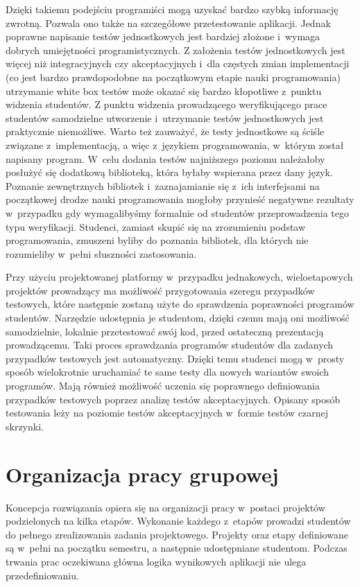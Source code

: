 Dzięki takiemu podejściu programiści mogą uzyskać bardzo szybką informację zwrotną.
Pozwala ono także na szczegółowe przetestowanie aplikacji.
Jednak poprawne napisanie testów jednostkowych jest bardziej złożone i~wymaga dobrych umiejętności programistycznych.
Z założenia testów jednostkowych jest więcej niż integracyjnych czy akceptacyjnych i~dla częstych zmian implementacji (co jest bardzo prawdopodobne na początkowym etapie nauki programowania) utrzymanie white box testów może okazać się bardzo kłopotliwe z~punktu widzenia studentów.
Z punktu widzenia prowadzącego weryfikującego prace studentów samodzielne utworzenie i~utrzymanie testów jednostkowych jest praktycznie niemożliwe.
Warto też zauważyć, że testy jednostkowe są ściśle związane z~implementacją, a więc z~językiem programowania, w~którym został napisany program.
W~celu dodania testów najniższego poziomu należałoby posłużyć się dodatkową biblioteką, która byłaby wspierana przez dany język.
Poznanie zewnętrznych bibliotek i~zaznajamianie się z~ich interfejsami na początkowej drodze nauki programowania mogłoby przynieść negatywne rezultaty w~przypadku gdy wymagalibyśmy formalnie od studentów przeprowadzenia tego typu weryfikacji.
Studenci, zamiast skupić się na zrozumieniu podstaw programowania, zmuszeni byliby do poznania bibliotek, dla których nie rozumieliby w~pełni słuszności zastosowania.

Przy użyciu projektowanej platformy w~przypadku jednakowych, wieloetapowych projektów prowadzący ma możliwość przygotowania szeregu przypadków testowych, które następnie zostaną użyte do sprawdzenia poprawności programów studentów.
Narzędzie udostępnia je studentom, dzięki czemu mają oni możliwość samodzielnie, lokalnie przetestować swój kod, przed ostateczną prezentacją prowadzącemu.
Taki proces sprawdzania programów studentów dla zadanych przypadków testowych jest automatyczny.
Dzięki temu studenci mogą w~prosty sposób wielokrotnie uruchamiać te same testy dla nowych wariantów swoich programów.
Mają również możliwość uczenia się poprawnego definiowania przypadków testowych poprzez analizę testów akceptacyjnych.
Opisany sposób testowania leży na poziomie testów akceptacyjnych w~formie testów czarnej skrzynki.

\section{Organizacja pracy grupowej}

Koncepcja rozwiązania opiera się na organizacji pracy w~postaci projektów podzielonych na kilka etapów.
Wykonanie każdego z~etapów prowadzi studentów do pełnego zrealizowania zadania projektowego.
Projekty oraz etapy definiowane są w~pełni na początku semestru, a następnie udostępniane studentom.
Podczas trwania prac oczekiwana główna logika wynikowych aplikacji nie ulega przedefiniowaniu.

